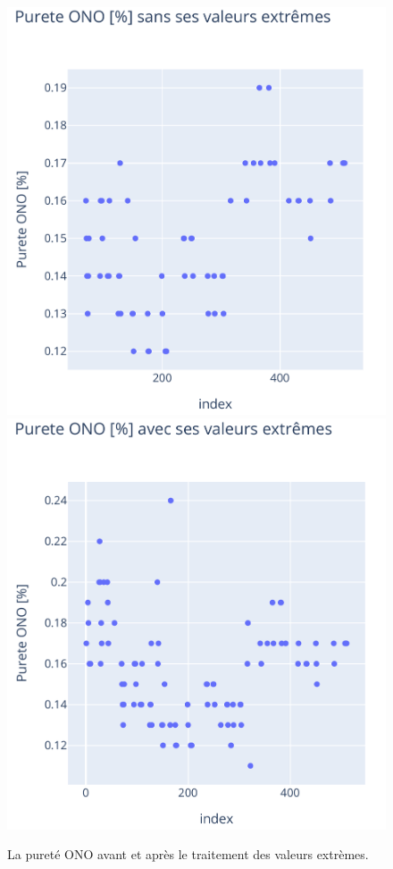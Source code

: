 \documentclass[12pt]{article}
\begin{document}
\begin{figure}[H]
    \centering
    \begin{adjustbox}{width=1.3\textwidth,center}
        \includegraphics[scale=1]{Images/Statistique/Purete ONO_sans_extreme.pdf}
        \includegraphics[scale=1]{Images/Statistique/Purete ONO_avec_extreme.pdf}
    \end{adjustbox}
    \caption{La pureté ONO avant et après le traitement des valeurs extrèmes.}
    \label{fig:ExtremeONO}
\end{figure}
\end{document}
